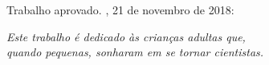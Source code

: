 \documentclass[
12pt,        %
openright,   %
twoside,     %
a4paper,     %
english,       %
brazil        %
%
%
]{ppgca}
\begin{document}

%
% 
%
\begin{folhadeaprovacao}

  \begin{center}
    {\theauthor}

    \vspace*{\fill}\vspace*{\fill}
    \thetitle
    \vspace*{\fill}

    \hspace{.45\textwidth}
    \begin{minipage}{.5\textwidth}
        \imprimirpreambulo
    \end{minipage}%
    \vspace*{\fill}
   \end{center}

   Trabalho aprovado. \imprimirlocal, 21 de novembro de 2018:


   \begin{center}
    \vspace*{0.5cm}
    {\large\imprimirlocal}
    \par
    {\large\imprimirdata}
    \vspace*{1cm}
  \end{center}

\end{folhadeaprovacao}

\begin{dedicatoria}
   \vspace*{\fill}
   \centering
   \noindent
   \textit{Este trabalho é dedicado às crianças adultas que,\\
   quando pequenas, sonharam em se tornar cientistas.} \vspace*{\fill}
\end{dedicatoria}
\end{document}
